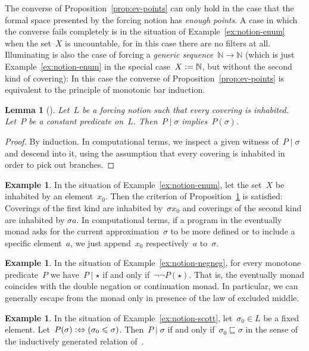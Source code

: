 \documentclass[com,11pt,crcready]{iosart2x}
\theoremstyle{definition}
\newtheorem{example}[definition]{Example}
\theoremstyle{plain}
\newtheorem{lemma}[definition]{Lemma}
\theoremstyle{remark}
\newcommand{\NN}{\mathbb{N}}
\newcommand{\defeq}{\vcentcolon=}
\renewcommand{\_}{\mathpunct{.}\,}
\begin{document}
The converse of Proposition~\ref{prop:ev-points} can only hold in the case that
the formal space presented by the forcing notion has \emph{enough points}.
A case in which the converse fails completely is in the situation of
Example~\ref{ex:notion-enum} when the set~$X$ is uncountable, for in this case
there are no filters at all. Illuminating is also the case of forcing a
\emph{generic sequence}~$\NN \to \NN$ (which is just
Example~\ref{ex:notion-enum} in the special case~$X \defeq \NN$, but without
the second kind of covering): In this case the converse of
Proposition~\ref{prop:ev-points} is equivalent to the principle of monotonic
bar induction.

\begin{lemma}[{\cite[Proposition~V.3.2]{joyal-tierney:grothendieck}}]\label{prop:cov-open}
Let~$L$ be a forcing notion such that every covering is inhabited. Let~$P$ be a
constant predicate on~$L$. Then~$P \mid \sigma$ implies~$P(\sigma)$.
\end{lemma}

\begin{proof}By induction. In computational terms, we inspect a given witness
of~$P \mid \sigma$ and descend into it, using the assumption that every
covering is inhabited in order to pick out branches.
\end{proof}

\begin{example}In the situation of Example~\ref{ex:notion-enum}, let the
set~$X$ be inhabited by an element~$x_0$. Then the criterion of
Proposition~\ref{prop:cov-open} is satisfied: Coverings of the first kind are
inhabited by~$\sigma x_0$ and coverings of the second kind are inhabited
by $\sigma a$. In computational terms, if a program in the eventually
monad asks for the current approximation~$\sigma$ to be more defined or to include a
specific element~$a$, we just append~$x_0$ respectively~$a$ to~$\sigma$.
\end{example}

\begin{example}In the situation of Example~\ref{ex:notion-negneg}, for every
monotone predicate~$P$ we have~$P \mid \star$ if and only if~$\neg\neg
P(\star)$. That is, the eventually monad coincides with the double negation or
continuation monad. In particular, we can generally escape from the monad only
in presence of the law of excluded middle.\end{example}

\begin{example}In the situation of Example~\ref{ex:notion-scott},
let~$\sigma_0 \in L$ be a fixed element. Let~$P(\sigma)
\vcentcolon\Leftrightarrow (\sigma_0 \leq \sigma)$. Then~$P \mid \sigma$ if
and only if~$\sigma_0 \sqsubseteq \sigma$ in the sense of the inductively
generated relation of~\cite[Definition~18]{wessel-schuster:radical}.\end{example}
\end{document}
